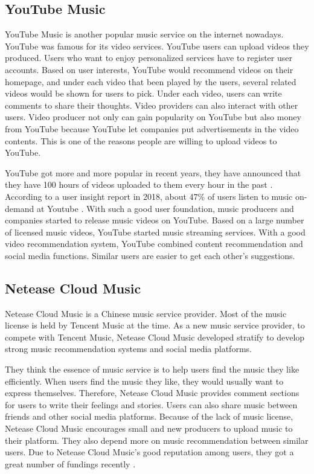 \subsection{YouTube Music}

YouTube Music is another popular music service on the internet nowadays. YouTube was famous for its video services. YouTube users can upload videos they produced. Users who want to enjoy personalized services have to register user accounts. Based on user interests, YouTube would recommend videos on their homepage, and under each video that been played by the users, several related videos would be shown for users to pick. Under each video, users can write comments to share their thoughts. Video providers can also interact with other users. Video producer not only can gain popularity on YouTube but also money from YouTube because YouTube let companies put advertisements in the video contents. This is one of the reasons people are willing to upload videos to YouTube.

YouTube got more and more popular in recent years, they have announced that they have 100 hours of videos uploaded to them every hour in the past \cite{Liikkanen2015}. According to a user insight report in 2018, about 47\% of users listen to music on-demand at Youtube \cite{ifpi}. With such a good user foundation, music producers and companies started to release music videos on YouTube. Based on a large number of licensed music videos, YouTube started music streaming services. With a good video recommendation system, YouTube combined content recommendation and social media functions. Similar users are easier to get each other's suggestions.

\subsection{Netease Cloud Music}

Netease Cloud Music is a Chinese music service provider. Most of the music license is held by Tencent Music at the time. As a new music service provider, to compete with Tencent Music, Netease Cloud Music developed stratify to develop strong music recommendation systems and social media platforms.

They think the essence of music service is to help users find the music they like efficiently. When users find the music they like, they would usually want to express themselves. Therefore, Netease Cloud Music provides comment sections for users to write their feelings and stories. Users can also share music between friends and other social media platforms. Because of the lack of music license, Netease Cloud Music encourages small and new producers to upload music to their platform. They also depend more on music recommendation between similar users. Due to Netease Cloud Music's good reputation among users, they got a great number of fundings recently \cite{russell2018}.

